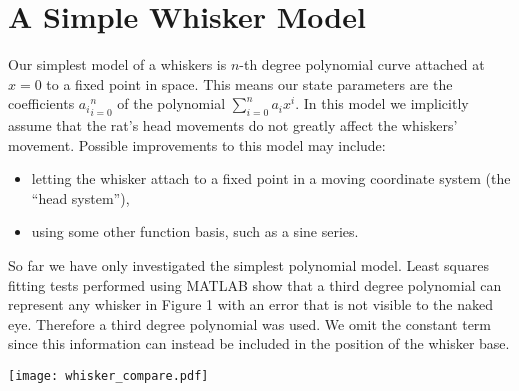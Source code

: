 \section*{A Simple Whisker Model}

Our simplest model of a whiskers is $n$-th degree polynomial curve attached at $x=0$ to a fixed point in space. This means our state parameters are the coefficients ${a_i}_{i=0}^n$ of the polynomial $\sum_{i=0}^n a_ix^i$. In this model we implicitly assume that the rat's head movements do not greatly affect the whiskers' movement. Possible improvements to this model may include:
\begin{itemize}
  \item letting the whisker attach to a fixed point in a moving coordinate system (the ``head system''),
  \item using some other function basis, such as a sine series.
\end{itemize}

So far we have only investigated the simplest polynomial model. Least squares fitting tests performed using MATLAB show that a third degree polynomial can represent any whisker in Figure 1 with an error that is not visible to the naked eye. Therefore a third degree polynomial was used. We omit the constant term since this information can instead be included in the position of the whisker base.

\begin{center}
  \texttt{[image: whisker\_compare.pdf]}
\end{center}
